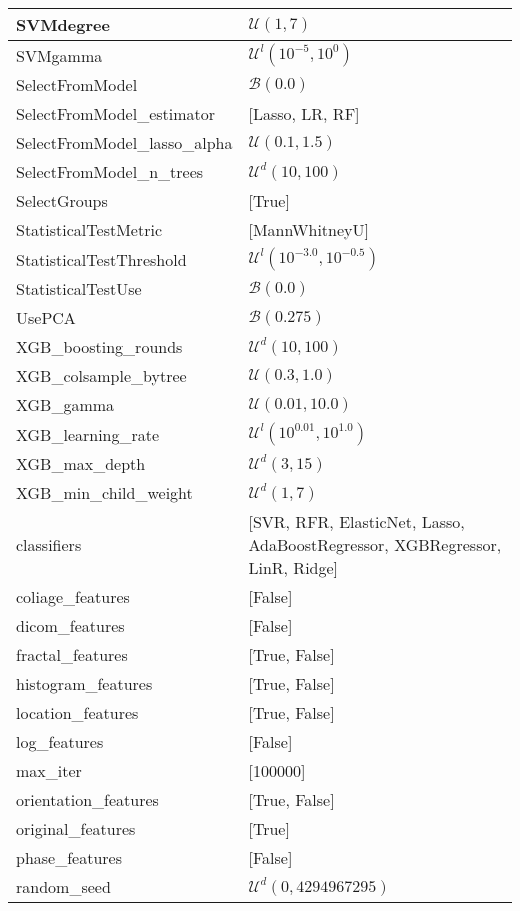 \begin{table}[]
\begin{tabular}{l|l}
SVMdegree & $\mathcal{U}(1, 7)$ \\ \hline
SVMgamma & $\mathcal{U}^l(10^{-5}, 10^{0})$ \\ \hline
SelectFromModel & $\mathcal{B}(0.0)$ \\ \hline
SelectFromModel\_estimator & {[Lasso, LR, RF]} \\ \hline
SelectFromModel\_lasso\_alpha & $\mathcal{U}(0.1, 1.5)$ \\ \hline
SelectFromModel\_n\_trees & $\mathcal{U}^d(10, 100)$ \\ \hline
SelectGroups & {[True]} \\ \hline
StatisticalTestMetric & {[MannWhitneyU]} \\ \hline
StatisticalTestThreshold & $\mathcal{U}^l(10^{-3.0}, 10^{-0.5})$ \\ \hline
StatisticalTestUse & $\mathcal{B}(0.0)$ \\ \hline
UsePCA & $\mathcal{B}(0.275)$ \\ \hline
XGB\_boosting\_rounds & $\mathcal{U}^d(10, 100)$ \\ \hline
XGB\_colsample\_bytree & $\mathcal{U}(0.3, 1.0)$ \\ \hline
XGB\_gamma & $\mathcal{U}(0.01, 10.0)$ \\ \hline
XGB\_learning\_rate & $\mathcal{U}^l(10^{0.01}, 10^{1.0})$ \\ \hline
XGB\_max\_depth & $\mathcal{U}^d(3, 15)$ \\ \hline
XGB\_min\_child\_weight & $\mathcal{U}^d(1, 7)$ \\ \hline
classifiers & {[SVR, RFR, ElasticNet, Lasso, AdaBoostRegressor, XGBRegressor, LinR, Ridge]} \\ \hline
coliage\_features & {[False]} \\ \hline
dicom\_features & {[False]} \\ \hline
fractal\_features & {[True, False]} \\ \hline
histogram\_features & {[True, False]} \\ \hline
location\_features & {[True, False]} \\ \hline
log\_features & {[False]} \\ \hline
max\_iter & {[100000]} \\ \hline
orientation\_features & {[True, False]} \\ \hline
original\_features & {[True]} \\ \hline
phase\_features & {[False]} \\ \hline
random\_seed & $\mathcal{U}^d(0, 4294967295)$ \\ \hline

\end{tabular}
\end{table}
